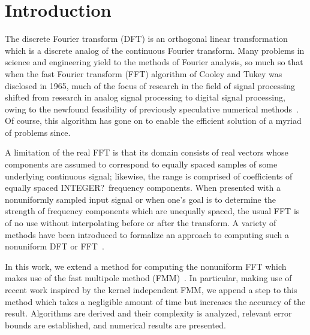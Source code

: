 \section{Introduction}

The discrete Fourier transform (DFT) is an orthogonal linear
transformation which is a discrete analog of the continuous Fourier
transform. Many problems in science and engineering yield to the
methods of Fourier analysis, so much so that when the fast Fourier
transform (FFT) algorithm of Cooley and Tukey was disclosed in 1965,
much of the focus of research in the field of signal processing
shifted from research in analog signal processing to digital signal
processing, owing to the newfound feasibility of previously
speculative numerical methods~\cite{book:dsp75}. Of course, this
algorithm has gone on to enable the efficient solution of a myriad of
problems since.

A limitation of the real FFT is that its domain consists of real
vectors whose components are assumed to correspond to equally spaced
samples of some underlying continuous signal; likewise, the range is
comprised of coefficients of equally spaced \TODO{}INTEGER?\ frequency
components. When presented with a nonuniformly sampled input signal or
when one's goal is to determine the strength of frequency components
which are unequally spaced, the usual FFT is of no use without
interpolating before or after the transform. A variety of methods have
been introduced to formalize an approach to computing such a
nonuniform DFT or FFT~\cite{Dutt95fastfourierII,Keiner06nfft3.0}.

In this work, we extend a method for computing the nonuniform FFT
which makes use of the fast multipole method
(FMM)~\cite{Dutt95fastfourierII}. In particular, making use of recent
work inspired by the kernel independent FMM, we append a step to this
method which takes a negligible amount of time but increases the
accuracy of the result. Algorithms are derived and their complexity is
analyzed, relevant error bounds are established, and numerical results
are presented.


